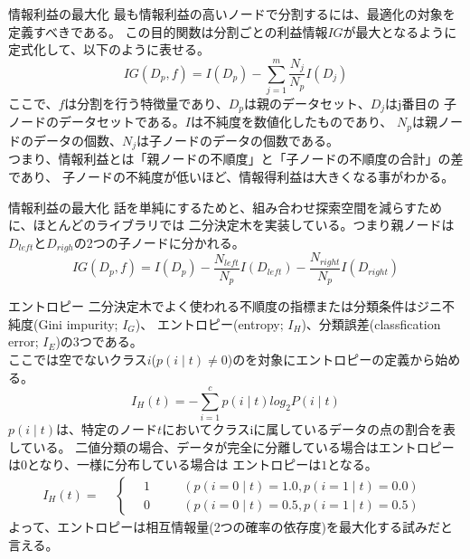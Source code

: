 \documentclass[aspectratio=169, dvipdfmx, 11pt]{beamer} %
\begin{document}
\begin{frame}{情報利益の最大化}
    最も情報利益の高いノードで分割するには、最適化の対象を定義すべきである。
    この目的関数は分割ごとの利益情報\(IG\)が最大となるように定式化して、以下のように表せる。
    \begin{equation*}
        IG(D_p, f) = I(D_p) - \sum_{j=1}^{m} \frac{N_j}{N_p} I(D_j)
    \end{equation*}
    ここで、\(f\)は分割を行う特徴量であり、\(D_p\)は親のデータセット、\(D_j\)はj番目の
    子ノードのデータセットである。\(I\)は不純度を数値化したものであり、
    \(N_p\)は親ノードのデータの個数、\(N_j\)は子ノードのデータの個数である。\\
    つまり、情報利益とは「親ノードの不順度」と「子ノードの不順度の合計」の差であり、
    子ノードの不純度が低いほど、情報得利益は大きくなる事がわかる。
\end{frame}

\begin{frame}{情報利益の最大化}
    話を単純にするためと、組み合わせ探索空間を減らすために、ほとんどのライブラリでは
    二分決定木を実装している。つまり親ノードは\(D_{left}\)と\(D_{righ}\)の2つの子ノードに分かれる。
    \begin{equation*}
        IG(D_p, f) = I(D_p) - \frac{N_{left}}{N_p}I(D_{left})- \frac{N_{right}}{N_p}I(D_{right})
    \end{equation*}
\end{frame}

\begin{frame}{エントロピー}
    二分決定木でよく使われる不順度の指標または分類条件はジニ不純度(Gini impurity; \(I_G\))、
    エントロピー(entropy; \(I_H\))、分類誤差(classfication error; \(I_E\))の3つである。\\
    ここでは空でないクラス\(i\)(\( p(i \mid t)\neq 0\))のを対象にエントロピーの定義から始める。
    \begin{equation*}
        I_H(t) = - \sum_{i=1}^{c}p(i \mid t)log_2P(i \mid t)
    \end{equation*}
    \(p(i \mid t)\)は、特定のノード\(t\)においてクラスiに属しているデータの点の割合を表している。
    二値分類の場合、データが完全に分離している場合はエントロピーは\(0\)となり、一様に分布している場合は
    エントロピーは\(1\)となる。
    \begin{equation*}
        I_H(t) = 
        \begin{aligned}
            & \left\{ \,
                \begin{aligned}
                    & 1 & \quad &(p(i=0 \mid t) = 1.0, p(i=1 \mid t) = 0.0) \\
                    & 0 & \quad &(p(i=0 \mid t) = 0.5, p(i=1 \mid t) = 0.5)
                \end{aligned}
            \right.
        \end{aligned}
    \end{equation*}
    よって、エントロピーは相互情報量(2つの確率の依存度)を最大化する試みだと言える。
\end{frame}
\end{document}
